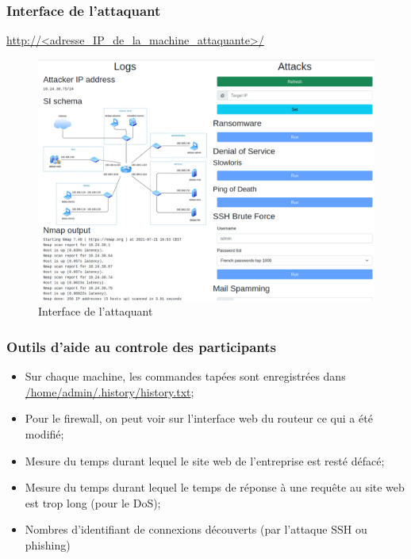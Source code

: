 \documentclass{beamer}
\begin{document}
		\begin{frame}
			\frametitle{Interface de l'attaquant}
			\url{http://<adresse_IP_de_la_machine_attaquante>/}
			\begin{center}
				\begin{figure}
					\includegraphics[scale=.18]{attacker.png}
					\caption{Interface de l'attaquant}
				\end{figure}
			\end{center}
		\end{frame}
		\begin{frame}
			\frametitle{Outils d'aide au controle des participants}
			\begin{itemize}
				\item Sur chaque machine, les commandes tapées sont enregistrées dans \url{/home/admin/.history/history.txt};
				\item Pour le firewall, on peut voir sur l'interface web du routeur ce qui a été modifié;
				\item Mesure du temps durant lequel le site web de l'entreprise est resté défacé;
				\item Mesure du temps durant lequel le temps de réponse à une requête au site web est trop long (pour le DoS);
				\item Nombres d'identifiant de connexions découverts (par l'attaque SSH ou phishing)
			\end{itemize}
		\end{frame}
\end{document}
